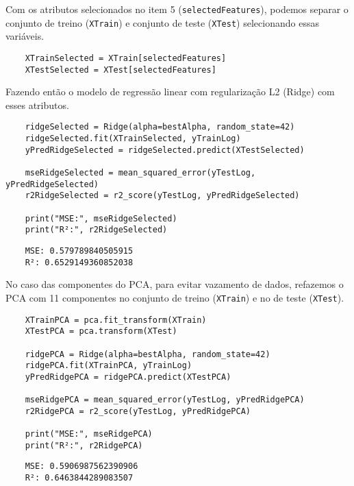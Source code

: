 Com os atributos selecionados no item 5 (\verb|selectedFeatures|), podemos separar o conjunto de treino (\verb|XTrain|) e conjunto de teste (\verb|XTest|) selecionando essas variáveis.
\begin{longlisting}
    \begin{verbatim}
    XTrainSelected = XTrain[selectedFeatures]
    XTestSelected = XTest[selectedFeatures]
    \end{verbatim}
\end{longlisting}

Fazendo então o modelo de regressão linear com regularização L2 (Ridge) com esses atributos.
\begin{longlisting}
    \begin{verbatim}
    ridgeSelected = Ridge(alpha=bestAlpha, random_state=42)
    ridgeSelected.fit(XTrainSelected, yTrainLog)
    yPredRidgeSelected = ridgeSelected.predict(XTestSelected)

    mseRidgeSelected = mean_squared_error(yTestLog, yPredRidgeSelected)
    r2RidgeSelected = r2_score(yTestLog, yPredRidgeSelected)

    print("MSE:", mseRidgeSelected)
    print("R²:", r2RidgeSelected)
    \end{verbatim}
\end{longlisting}
\begin{verbatim}
    MSE: 0.579789840505915
    R²: 0.6529149360852038
\end{verbatim}

No caso das componentes do PCA, para evitar vazamento de dados, refazemos o PCA com 11 componentes no conjunto de treino (\verb|XTrain|) e no de teste (\verb|XTest|).
\begin{longlisting}
    \begin{verbatim}
    XTrainPCA = pca.fit_transform(XTrain)
    XTestPCA = pca.transform(XTest)

    ridgePCA = Ridge(alpha=bestAlpha, random_state=42)
    ridgePCA.fit(XTrainPCA, yTrainLog)
    yPredRidgePCA = ridgePCA.predict(XTestPCA)

    mseRidgePCA = mean_squared_error(yTestLog, yPredRidgePCA)
    r2RidgePCA = r2_score(yTestLog, yPredRidgePCA)

    print("MSE:", mseRidgePCA)
    print("R²:", r2RidgePCA)
    \end{verbatim}
\end{longlisting}
\begin{verbatim}
    MSE: 0.5906987562390906
    R²: 0.6463844289083507
\end{verbatim}

